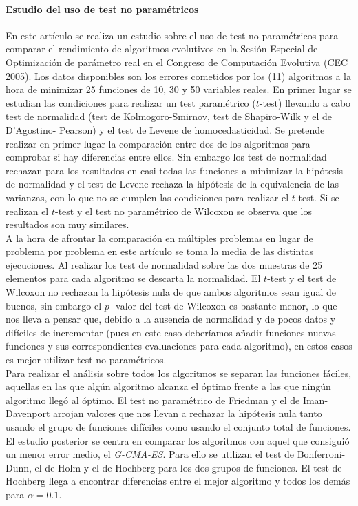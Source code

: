 	\paragraph{Estudio del uso de test no paramétricos} 
	\cite{GARCIA09} En este artículo se realiza un estudio
sobre el uso de test no paramétricos para comparar el 
rendimiento de algoritmos evolutivos en la Sesión Especial de 
Optimización de parámetro real en el Congreso de Computación 
Evolutiva (CEC 2005). Los datos disponibles son los errores 
cometidos por los (11) algoritmos a la hora de minimizar 25 
funciones de 10, 30 y 50 variables reales. En primer lugar se 
estudian las condiciones para realizar un test paramétrico 
($t$-test) llevando a cabo test de normalidad (test de 
Kolmogoro-Smirnov, test de Shapiro-Wilk y el de D'Agostino-
Pearson) y el test de Levene de homocedasticidad. Se 
pretende realizar en primer lugar la comparación entre dos de 
los algoritmos para comprobar si hay diferencias entre ellos. 
Sin embargo los test de normalidad rechazan para los 
resultados en casi todas las funciones a minimizar la 
hipótesis de normalidad y el test de Levene rechaza la 
hipótesis de la equivalencia de las varianzas, con lo que no 
se cumplen las condiciones para realizar el $t$-test. Si se 
realizan el $t$-test y el test no paramétrico de Wilcoxon se 
observa que los resultados son muy similares.\\
	A la hora de afrontar la comparación en múltiples 
problemas en lugar de problema por problema en este artículo 
se toma la media de las distintas ejecuciones. Al realizar 
los test de normalidad sobre las dos muestras de 25 elementos 
para cada algoritmo se descarta la normalidad. El $t$-test y 
el test de Wilcoxon no rechazan la hipótesis nula de que 
ambos algoritmos sean igual de buenos, sin embargo el $p$-
valor del test de Wilcoxon es bastante menor, lo que nos 
lleva a pensar que, debido a la ausencia de normalidad y de 
pocos datos y difíciles de incrementar (pues en este caso 
deberíamos añadir funciones nuevas funciones y sus 
correspondientes evaluaciones para cada algoritmo), en estos 
casos es mejor utilizar test no paramétricos.\\
	Para realizar el análisis sobre todos los algoritmos se 
separan las funciones fáciles, aquellas en las que algún 
algoritmo alcanza el óptimo frente a las que ningún algoritmo 
llegó al óptimo. El test no paramétrico de Friedman y el de 
Iman-Davenport arrojan valores que nos llevan a rechazar la 
hipótesis nula tanto usando el grupo de funciones difíciles 
como usando el conjunto total de funciones.\\
	El estudio posterior se centra en comparar los algoritmos 
con aquel que consiguió un menor error medio, el 
\textit{G-CMA-ES}. Para ello se utilizan el test de 
Bonferroni-Dunn, el de Holm y el de Hochberg para los dos 
grupos de funciones. El test de Hochberg llega a encontrar 
diferencias entre el mejor algoritmo y todos los demás para 
$\alpha=0.1$. 
	
